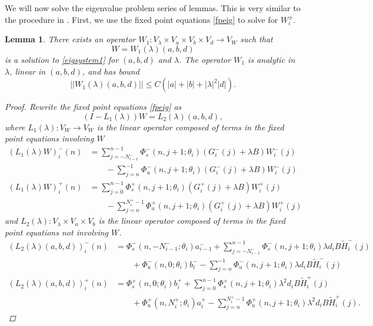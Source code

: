 \documentclass[12pt]{elsarticle}
\newtheorem{lemma}{Lemma}
\begin{document}
We will now solve the eigenvalue problem series of lemmas. This is very similar to the procedure in \cite{Sandstede1998}. First, we use the fixed point equations \cref{fpeig} to solve for $W_i^\pm$. 

\begin{lemma}\label{eiginv1}
There exists an operator $W_1: V_\lambda \times V_a \times V_b \times V_d \rightarrow V_W$ such that
\[
W = W_1(\lambda)(a,b,d)
\]
is a solution to \cref{eigsystem1} for $(a,b,d)$ and $\lambda$. The operator $W_1$ is analytic in $\lambda$, linear in $(a,b,d)$, and has bound
\begin{equation}\label{W1bound}
||W_1(\lambda)(a,b,d)|| \leq C \left( |a| + |b| + |\lambda|^2 |d| \right).
\end{equation}

\begin{proof}
Rewrite the fixed point equations \cref{fpeig} as
\[
(I - L_1(\lambda))W = L_2(\lambda)(a,b,d),
\]
where $L_1(\lambda): V_W \rightarrow V_W$ is the linear operator composed of terms in the fixed point equations involving $W$
\begin{align*}
(L_1(\lambda)W)_i^-(n) &= \sum_{j = -N_{i-1}^-}^{n-1} \Phi_s^-(n, j+1; \theta_i)
(G_i^-(j) + \lambda B) W_i^-(j) \\
&\qquad- \sum_{j = n}^{-1} \Phi_u^-(n, j+1; \theta_i) 
(G_i^-(j) + \lambda B) W_i^-(j)\\
(L_1(\lambda)W)_i^+(n) &= \sum_{j = 0}^{n-1} \Phi_s^+(n, j+1; \theta_i) 
(G_i^+(j) + \lambda B) W_i^+(j) \\
&\qquad-\sum_{j = n}^{N_i^+-1} \Phi_u^+(n, j+1; \theta_i) 
(G_i^+(j) + \lambda B) W_i^+(j)
\end{align*}
and $L_2(\lambda): V_\lambda \times V_a \times V_b $ is the linear operator composed of terms in the fixed point equations not involving $W$.
\begin{align*}
(L_2(\lambda)(a,b,d))_i^-(n) &= 
\Phi_s^-(n, -N_{i-1}^-; \theta_i) a_{i-1}^- + \sum_{j = -N_{i-1}^-}^{n-1} \Phi_s^-(n, j+1; \theta_i)
\lambda d_i B \tilde{H}_i^-(j)
 \\
&\qquad+ \Phi_u^-(n, 0; \theta_i) b_i^- - \sum_{j = n}^{-1} \Phi_u^-(n, j+1; \theta_i) 
\lambda d_i B \tilde{H}_i^-(j) \\
(L_2(\lambda)(a,b,d))_i^+(n) &= \Phi_s^+(n, 0; \theta_i) b_i^+ + \sum_{j = 0}^{n-1} \Phi_s^+(n, j+1; \theta_i)\lambda^2 d_i B \tilde{H}_i^+(j) \\
&\qquad+ \Phi_u^+(n, N_i^+; \theta_i) a_i^+ - \sum_{j = n}^{N_i^+-1} \Phi_u^+(n, j+1; \theta_i)\lambda^2 d_i B \tilde{H}_i^+(j).

\end{align*}
\end{proof}
\end{lemma}
\end{document}
